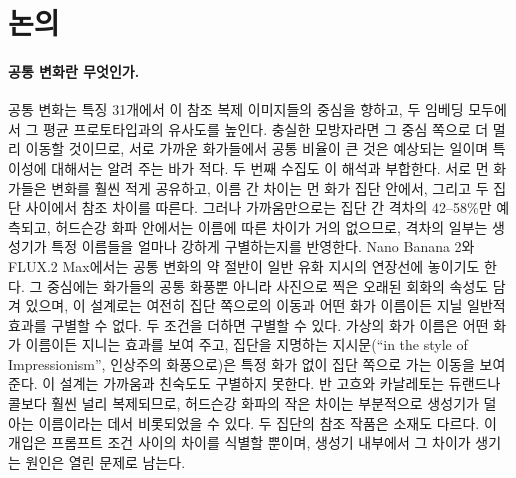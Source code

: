 \documentclass[10pt]{article}
\begin{document}
\section{논의}\label{sec:discussion}

\paragraph{공통 변화란 무엇인가.}
공통 변화는 특징 31개에서 이 참조 복제 이미지들의 중심을 향하고, 두 임베딩 모두에서 그 평균
프로토타입과의 유사도를 높인다. 충실한 모방자라면 그 중심 쪽으로 더 멀리 이동할 것이므로, 서로 가까운
화가들에서 공통 비율이 큰 것은 예상되는 일이며 특이성에 대해서는 알려 주는 바가 적다. 두 번째 수집도 이
해석과 부합한다. 서로 먼 화가들은 변화를 훨씬 적게 공유하고, 이름 간 차이는 먼 화가 집단 안에서, 그리고
두 집단 사이에서 참조 차이를 따른다. 그러나 가까움만으로는 집단 간 격차의 42--58\%만 예측되고, 허드슨강
화파 안에서는 이름에 따른 차이가 거의 없으므로, 격차의 일부는 생성기가 특정 이름들을 얼마나 강하게
구별하는지를 반영한다. Nano Banana 2와 FLUX.2 Max에서는 공통 변화의 약 절반이 일반 유화 지시의
연장선에 놓이기도 한다. 그 중심에는 화가들의 공통 화풍뿐 아니라 사진으로 찍은 오래된 회화의 속성도 담겨
있으며, 이 설계로는 여전히 집단 쪽으로의 이동과 어떤 화가 이름이든 지닐 일반적 효과를 구별할 수 없다. 두
조건을 더하면 구별할 수 있다. 가상의 화가 이름은 어떤 화가 이름이든 지니는 효과를 보여 주고, 집단을
지명하는 지시문(``in the style of Impressionism'', 인상주의 화풍으로)은 특정 화가 없이 집단 쪽으로 가는
이동을 보여 준다. 이 설계는 가까움과 친숙도도 구별하지 못한다. 반 고흐와 카날레토는 듀랜드나 콜보다
훨씬 널리 복제되므로, 허드슨강 화파의 작은 차이는 부분적으로 생성기가 덜 아는 이름이라는 데서 비롯되었을
수 있다. 두 집단의 참조 작품은 소재도 다르다.
이 개입은 프롬프트 조건 사이의 차이를 식별할 뿐이며, 생성기 내부에서 그 차이가 생기는 원인은 열린
문제로 남는다.
\end{document}
